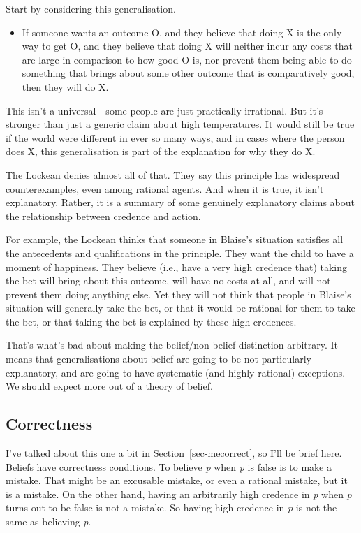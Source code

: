 \documentclass[
  12pt,
  letterpaper,
]{scrbook}
\providecommand{\tightlist}{%
  \setlength{\itemsep}{0pt}\setlength{\parskip}{0pt}}\usepackage{longtable,booktabs,array}
\begin{document}
Start by considering this generalisation.

\begin{itemize}
\tightlist
\item
  If someone wants an outcome O, and they believe that doing X is the
  only way to get O, and they believe that doing X will neither incur
  any costs that are large in comparison to how good O is, nor prevent
  them being able to do something that brings about some other outcome
  that is comparatively good, then they will do X.
\end{itemize}

This isn't a universal - some people are just practically irrational.
But it's stronger than just a generic claim about high temperatures. It
would still be true if the world were different in ever so many ways,
and in cases where the person does X, this generalisation is part of the
explanation for why they do X.

The Lockean denies almost all of that. They say this principle has
widespread counterexamples, even among rational agents. And when it is
true, it isn't explanatory. Rather, it is a summary of some genuinely
explanatory claims about the relationship between credence and action.

For example, the Lockean thinks that someone in Blaise's situation
satisfies all the antecedents and qualifications in the principle. They
want the child to have a moment of happiness. They believe (i.e., have a
very high credence that) taking the bet will bring about this outcome,
will have no costs at all, and will not prevent them doing anything
else. Yet they will not think that people in Blaise's situation will
generally take the bet, or that it would be rational for them to take
the bet, or that taking the bet is explained by these high credences.

That's what's bad about making the belief/non-belief distinction
arbitrary. It means that generalisations about belief are going to be
not particularly explanatory, and are going to have systematic (and
highly rational) exceptions. We should expect more out of a theory of
belief.

\subsection{Correctness}\label{sec-lockecorrect}

I've talked about this one a bit in Section~\ref{sec-mecorrect}, so I'll
be brief here. Beliefs have correctness conditions. To believe \emph{p}
when \emph{p} is false is to make a mistake. That might be an excusable
mistake, or even a rational mistake, but it is a mistake. On the other
hand, having an arbitrarily high credence in \emph{p} when \emph{p}
turns out to be false is not a mistake. So having high credence in
\emph{p} is not the same as believing \emph{p}.
\end{document}
